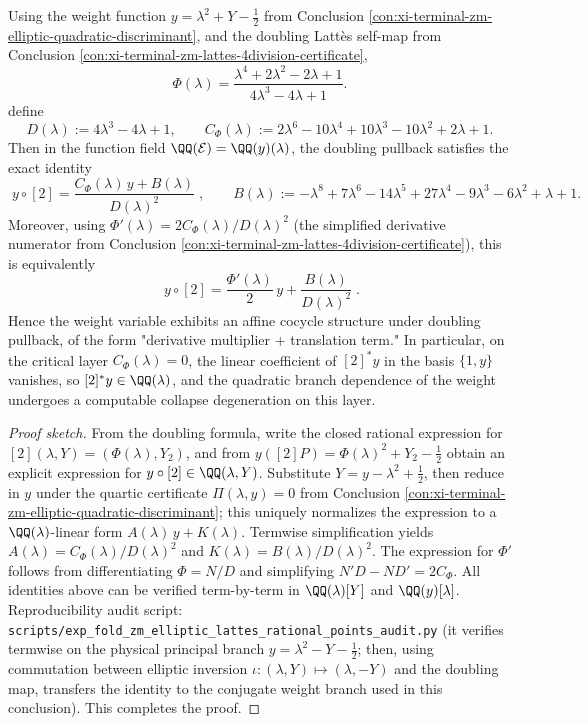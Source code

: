 
\begin{conclusion}\label{con:xi-terminal-zm-elliptic-y-doubling-affine-cocycle}
Using the weight function \(y=\lambda^{2}+Y-\tfrac12\) from Conclusion \ref{con:xi-terminal-zm-elliptic-quadratic-discriminant}, and the doubling Latt\`es self-map from Conclusion \ref{con:xi-terminal-zm-lattes-4division-certificate},
\[
\Phi(\lambda)=\frac{\lambda^{4}+2\lambda^{2}-2\lambda+1}{4\lambda^{3}-4\lambda+1}.
\]
define
\[
D(\lambda):=4\lambda^{3}-4\lambda+1,\qquad
C_{\Phi}(\lambda):=2\lambda^{6}-10\lambda^{4}+10\lambda^{3}-10\lambda^{2}+2\lambda+1.
\]
Then in the function field \(\QQ(\mathcal{E})=\QQ(y)(\lambda)\), the doubling pullback satisfies the exact identity
\[
\boxed{\;
y\circ[2]=\frac{C_{\Phi}(\lambda)\,y+B(\lambda)}{D(\lambda)^{2}}\;},
\qquad
B(\lambda):=-\lambda^{8}+7\lambda^{6}-14\lambda^{5}+27\lambda^{4}-9\lambda^{3}-6\lambda^{2}+\lambda+1.
\]
Moreover, using \(\Phi'(\lambda)=2C_{\Phi}(\lambda)/D(\lambda)^{2}\) (the simplified derivative numerator from Conclusion \ref{con:xi-terminal-zm-lattes-4division-certificate}), this is equivalently
\[
\boxed{\;
y\circ[2]=\frac{\Phi'(\lambda)}{2}\,y+\frac{B(\lambda)}{D(\lambda)^{2}}\; }.
\]
Hence the weight variable exhibits an affine cocycle structure under doubling pullback, of the form "derivative multiplier + translation term."
In particular, on the critical layer \(C_{\Phi}(\lambda)=0\), the linear coefficient of \([2]^*y\) in the basis \(\{1,y\}\) vanishes, so \([2]^*y\in\QQ(\lambda)\), and the quadratic branch dependence of the weight undergoes a computable collapse degeneration on this layer.
\end{conclusion}
\begin{proof}[Proof sketch]
From the doubling formula, write the closed rational expression for \([2](\lambda,Y)=(\Phi(\lambda),Y_2)\), and from
\(
y([2]P)=\Phi(\lambda)^{2}+Y_2-\tfrac12
\)
obtain an explicit expression for \(y\circ[2]\in\QQ(\lambda,Y)\).
Substitute \(Y=y-\lambda^{2}+\tfrac12\), then reduce in \(y\) under the quartic certificate \(\Pi(\lambda,y)=0\) from Conclusion \ref{con:xi-terminal-zm-elliptic-quadratic-discriminant}; this uniquely normalizes the expression to a \(\QQ(\lambda)\)-linear form \(A(\lambda)\,y+K(\lambda)\).
Termwise simplification yields \(A(\lambda)=C_{\Phi}(\lambda)/D(\lambda)^{2}\) and \(K(\lambda)=B(\lambda)/D(\lambda)^{2}\).
The expression for \(\Phi'\) follows from differentiating \(\Phi=N/D\) and simplifying \(N'D-ND'=2C_{\Phi}\).
All identities above can be verified term-by-term in \(\QQ(\lambda)[Y]\) and \(\QQ(y)[\lambda]\).
Reproducibility audit script: \texttt{scripts/exp\_fold\_zm\_elliptic\_lattes\_rational\_points\_audit.py} (it verifies termwise on the physical principal branch \(y=\lambda^{2}-Y-\tfrac12\); then, using commutation between elliptic inversion \(\iota:(\lambda,Y)\mapsto(\lambda,-Y)\) and the doubling map, transfers the identity to the conjugate weight branch used in this conclusion). This completes the proof.
\end{proof}

